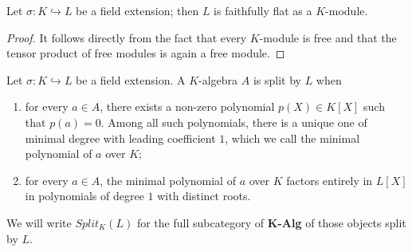 \begin{proposition}
\label{prop:LFaithfullyFlat}
    Let $\sigma:K\hookrightarrow L$ be a field extension; then $L$ is faithfully flat as a $K$-module.
    \begin{proof}
        It follows directly from the fact that every $K$-module is free and that the tensor product of free modules is again a free module.
    \end{proof}
\end{proposition}

\begin{definition}
\label{def:SplitAlgebras}
     Let $\sigma:K\hookrightarrow L$ be a field extension. A $K$-algebra $A$ is split by $L$ when
    \begin{enumerate}
        \item for every $a\in A$, there exists a non-zero polynomial $p(X)\in K[X]$ such that $p(a)=0$. Among all such polynomials, there is a unique one of minimal degree with leading coefficient $1$, which we call the minimal polynomial of $a$ over $K$;
        \item for every $a\in A$, the minimal polynomial of $a$ over $K$ factors entirely in $L[X]$ in polynomials of degree $1$ with distinct roots.
    \end{enumerate}

    We will write $Split_K(L)$ for the full subcategory of \textbf{K-Alg} of those objects split by $L$.
\end{definition}

